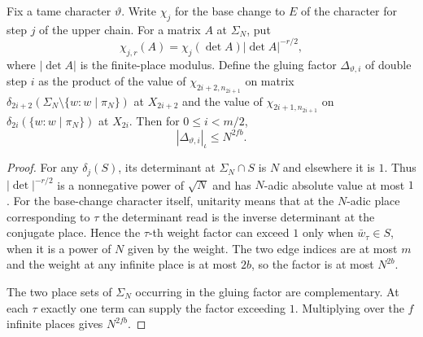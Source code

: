 \begin{lemma}
\label{lem:a-level-glued-factor}
\emitthmsource
Fix a tame character $\vartheta$. Write $\chi_j$ for the base change to $E$ of the character for step $j$ of the upper chain. For a matrix $A$ at $\Sigma_N$, put
\[
 \chi_{j,r}(A)=\chi_j(\det A)|\det A|^{-r/2},
\]
where $|\det A|$ is the finite-place modulus. Define the gluing factor $\Delta_{\vartheta,i}$ of double step $i$ as the product of the value of $\chi_{2i+2,n_{2i+1}}$ on matrix $\delta_{2i+2}(\Sigma_N\setminus\{w:w\mid\pi_N\})$ at $X_{2i+2}$ and the value of $\chi_{2i+1,n_{2i+1}}$ on $\delta_{2i}(\{w:w\mid\pi_N\})$ at $X_{2i}$. Then for $0\le i<m/2$,
\[
 |\Delta_{\vartheta,i}|_\iota\le N^{2fb}.
\]
\end{lemma}
\begin{proof}
For any $\delta_j(S)$, its determinant at $\Sigma_N\cap S$ is $N$ and elsewhere it is $1$. Thus $|\det|^{-r/2}$ is a nonnegative power of $\sqrt N$ and has $N$-adic absolute value at most $1$. For the base-change character itself, unitarity means that at the $N$-adic place corresponding to $\tau$ the determinant read is the inverse determinant at the conjugate place. Hence the $\tau$-th weight factor can exceed $1$ only when $\bar w_\tau\in S$, when it is a power of $N$ given by the weight. The two edge indices are at most $m$ and the weight at any infinite place is at most $2b$, so the factor is at most $N^{2b}$.

The two place sets of $\Sigma_N$ occurring in the gluing factor are complementary. At each $\tau$ exactly one term can supply the factor exceeding $1$. Multiplying over the $f$ infinite places gives $N^{2fb}$.
\end{proof}

